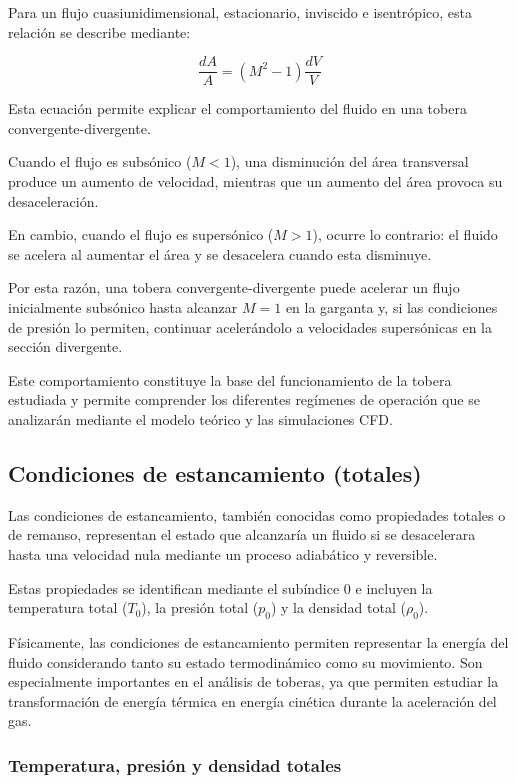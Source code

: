\documentclass[12pt,letterpaper]{article}
\numberwithin{equation}{section}
\begin{document}
Para un flujo cuasiunidimensional,
estacionario, inviscido e isentrópico,
esta relación se describe mediante:

\begin{equation}
    \frac{dA}{A}=(M^2-1)\frac{dV}{V}
\end{equation}

Esta ecuación permite explicar el comportamiento
del fluido en una tobera convergente-divergente.

Cuando el flujo es subsónico ($M<1$),
una disminución del área transversal
produce un aumento de velocidad, mientras
que un aumento del área provoca su
desaceleración.

En cambio, cuando el flujo es supersónico
($M>1$), ocurre lo contrario: el fluido
se acelera al aumentar el área y se
desacelera cuando esta disminuye.

Por esta razón, una tobera
convergente-divergente puede acelerar
un flujo inicialmente subsónico hasta
alcanzar $M=1$ en la garganta y,
si las condiciones de presión lo permiten,
continuar acelerándolo a velocidades
supersónicas en la sección divergente.

Este comportamiento constituye la base
del funcionamiento de la tobera estudiada
y permite comprender los diferentes
regímenes de operación que se analizarán
mediante el modelo teórico y las
simulaciones CFD.


\subsection{Condiciones de estancamiento (totales)}

Las condiciones de estancamiento, también conocidas como
propiedades totales o de remanso, representan el estado
que alcanzaría un fluido si se desacelerara hasta una
velocidad nula mediante un proceso adiabático y reversible.

Estas propiedades se identifican mediante el subíndice
$0$ e incluyen la temperatura total ($T_0$), la presión
total ($p_0$) y la densidad total ($\rho_0$).

Físicamente, las condiciones de estancamiento permiten
representar la energía del fluido considerando tanto
su estado termodinámico como su movimiento. Son
especialmente importantes en el análisis de toberas,
ya que permiten estudiar la transformación de energía
térmica en energía cinética durante la aceleración
del gas.

\subsubsection{Temperatura, presión y densidad totales}
\end{document}
